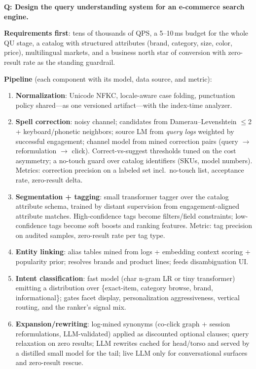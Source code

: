 \begin{interviewq}
\textbf{Q: Design the query understanding system for an e-commerce search engine.}

 \quad {} \quad \badgefreq{\freqhigh}

\stronganswer

\textbf{Requirements first}: tens of thousands of QPS, a 5--10\,ms budget for the whole QU stage, a catalog with structured attributes (brand, category, size, color, price), multilingual markets, and a business north star of conversion with zero-result rate as the standing guardrail.

\textbf{Pipeline} (each component with its model, data source, and metric):
\begin{enumerate}
    \item \textbf{Normalization}: Unicode NFKC, locale-aware case folding, punctuation policy shared---as one versioned artifact---with the index-time analyzer.
    \item \textbf{Spell correction}: noisy channel; candidates from Damerau--Levenshtein $\le$2 + keyboard/phonetic neighbors; source LM from \textit{query logs} weighted by successful engagement; channel model from mined correction pairs (query $\to$ reformulation $\to$ click). Correct-vs-suggest thresholds tuned on the cost asymmetry; a no-touch guard over catalog identifiers (SKUs, model numbers). Metrics: correction precision on a labeled set incl.\ no-touch list, acceptance rate, zero-result delta.
    \item \textbf{Segmentation + tagging}: small transformer tagger over the catalog attribute schema, trained by distant supervision from engagement-aligned attribute matches. High-confidence tags become filters/field constraints; low-confidence tags become soft boosts and ranking features. Metric: tag precision on audited samples, zero-result rate per tag type.
    \item \textbf{Entity linking}: alias tables mined from logs + embedding context scoring + popularity prior; resolves brands and product lines; feeds disambiguation UI.
    \item \textbf{Intent classification}: fast model (char n-gram LR or tiny transformer) emitting a distribution over \{exact-item, category browse, brand, informational\}; gates facet display, personalization aggressiveness, vertical routing, and the ranker's signal mix.
    \item \textbf{Expansion/rewriting}: log-mined synonyms (co-click graph + session reformulations, LLM-validated) applied as discounted optional clauses; query relaxation on zero results; LLM rewrites cached for head/torso and served by a distilled small model for the tail; live LLM only for conversational surfaces and zero-result rescue.
\end{enumerate}


\end{interviewq}
